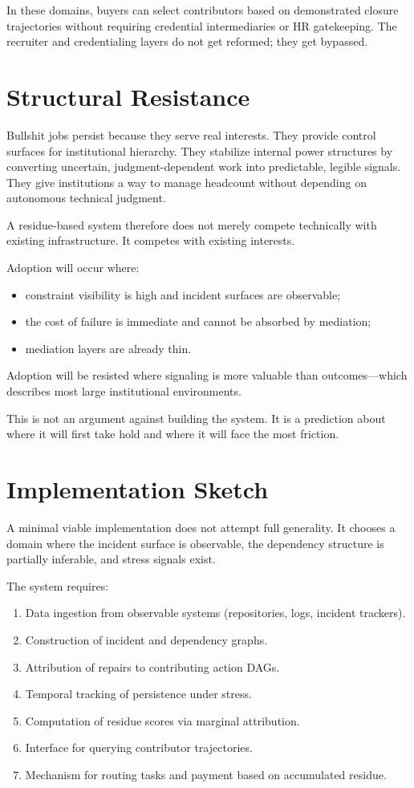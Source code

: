 \documentclass[12pt]{article}
\begin{document}
In these domains, buyers can select contributors based on demonstrated
closure trajectories without requiring credential intermediaries or HR
gatekeeping. The recruiter and credentialing layers do not get reformed;
they get bypassed.

\section{Structural Resistance}

Bullshit jobs persist because they serve real interests. They provide
control surfaces for institutional hierarchy. They stabilize internal
power structures by converting uncertain, judgment-dependent work into
predictable, legible signals. They give institutions a way to manage
headcount without depending on autonomous technical judgment.

A residue-based system therefore does not merely compete technically
with existing infrastructure. It competes with existing interests.

Adoption will occur where:
\begin{itemize}
  \item constraint visibility is high and incident surfaces are
    observable;
  \item the cost of failure is immediate and cannot be absorbed by
    mediation;
  \item mediation layers are already thin.
\end{itemize}

Adoption will be resisted where signaling is more valuable than
outcomes---which describes most large institutional environments.

This is not an argument against building the system. It is a prediction
about where it will first take hold and where it will face the most
friction.

\section{Implementation Sketch}

A minimal viable implementation does not attempt full generality. It
chooses a domain where the incident surface is observable, the
dependency structure is partially inferable, and stress signals exist.

The system requires:
\begin{enumerate}
  \item Data ingestion from observable systems (repositories, logs,
    incident trackers).
  \item Construction of incident and dependency graphs.
  \item Attribution of repairs to contributing action DAGs.
  \item Temporal tracking of persistence under stress.
  \item Computation of residue scores via marginal attribution.
  \item Interface for querying contributor trajectories.
  \item Mechanism for routing tasks and payment based on accumulated
    residue.
\end{enumerate}
\end{document}
